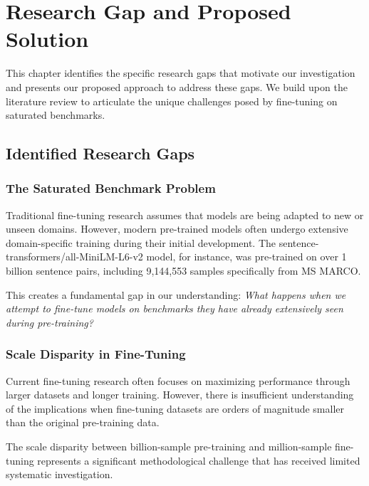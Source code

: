 
\chapter{Research Gap and Proposed Solution} %

\label{Chapter3} %


This chapter identifies the specific research gaps that motivate our investigation and presents our proposed approach to address these gaps. We build upon the literature review to articulate the unique challenges posed by fine-tuning on saturated benchmarks.

\section{Identified Research Gaps}

\subsection{The Saturated Benchmark Problem}

Traditional fine-tuning research assumes that models are being adapted to new or unseen domains. However, modern pre-trained models often undergo extensive domain-specific training during their initial development. The sentence-transformers/all-MiniLM-L6-v2 model, for instance, was pre-trained on over 1 billion sentence pairs, including 9,144,553 samples specifically from MS MARCO.

This creates a fundamental gap in our understanding: \textit{What happens when we attempt to fine-tune models on benchmarks they have already extensively seen during pre-training?}

\subsection{Scale Disparity in Fine-Tuning}

Current fine-tuning research often focuses on maximizing performance through larger datasets and longer training. However, there is insufficient understanding of the implications when fine-tuning datasets are orders of magnitude smaller than the original pre-training data.

The scale disparity between billion-sample pre-training and million-sample fine-tuning represents a significant methodological challenge that has received limited systematic investigation.

